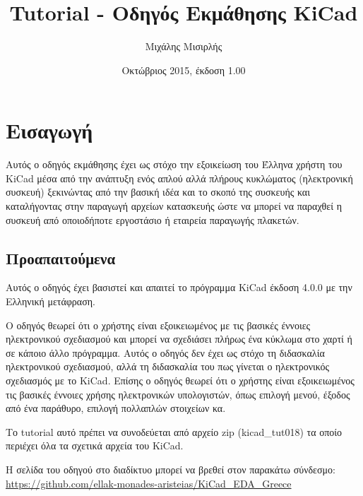 \documentclass[a4paper]{article}
\title{Tutorial - Οδηγός Εκμάθησης KiCad}
\author{Μιχάλης Μισιρλής}
\date{Οκτώβριος 2015, έκδοση 1.00}
\begin{document}
\maketitle

\pagebreak
\tableofcontents
\pagebreak

\newpage
\section{Εισαγωγή}
Αυτός ο οδηγός εκμάθησης έχει ως στόχο την εξοικείωση του Έλληνα χρήστη του \textenglish{KiCad} μέσα από την ανάπτυξη ενός απλού αλλά πλήρους κυκλώματος (ηλεκτρονική συσκευή) ξεκινώντας από την βασική ιδέα και το σκοπό της συσκευής και καταλήγοντας στην παραγωγή αρχείων κατασκευής ώστε να μπορεί να παραχθεί η συσκευή από οποιοδήποτε εργοστάσιο ή εταιρεία παραγωγής πλακετών.

\subsection{Προαπαιτούμενα}
\label{sec:prereq}
Αυτός ο οδηγός έχει βασιστεί και απαιτεί το πρόγραμμα \textenglish{KiCad} έκδοση 4.0.0 με την Ελληνική μετάφραση. 

Ο οδηγός θεωρεί ότι ο χρήστης είναι εξοικειωμένος με τις βασικές έννοιες ηλεκτρονικού σχεδιασμού και μπορεί να σχεδιάσει πλήρως ένα κύκλωμα στο χαρτί ή σε κάποιο άλλο πρόγραμμα. Αυτός ο οδηγός δεν έχει ως στόχο τη διδασκαλία ηλεκτρονικού σχεδιασμού, αλλά τη διδασκαλία του πως γίνεται ο ηλεκτρονικός σχεδιασμός με το \textenglish{KiCad}. Επίσης ο οδηγός θεωρεί ότι ο χρήστης είναι εξοικειωμένος τις βασικές έννοιες χρήσης ηλεκτρονικών υπολογιστών, όπως επιλογή μενού, έξοδος από ένα παράθυρο, επιλογή πολλαπλών στοιχείων κα.


Το tutorial αυτό πρέπει να συνοδεύεται από αρχείο zip (kicad\_tut018) τα οποίο περιέχει όλα τα σχετικά αρχεία του \textenglish{KiCad}. 

Η σελίδα του οδηγού στο διαδίκτυο μπορεί να βρεθεί στον παρακάτω σύνδεσμο:\\
\href{https://github.com/ellak-monades-aristeias/KiCad\_EDA\_Greece}{https://github.com/ellak-monades-aristeias/KiCad\_EDA\_Greece}
\end{document}
